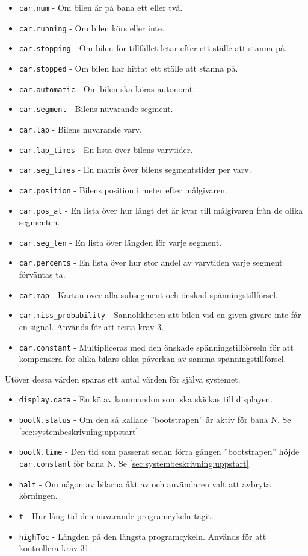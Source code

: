 \begin{itemize}

\item \texttt{car.num} - Om bilen är på bana ett eller två.
\item \texttt{car.running} - Om bilen körs eller inte.
\item \texttt{car.stopping} - Om bilen för tillfället letar efter ett ställe att stanna på.
\item \texttt{car.stopped} - Om bilen har hittat ett ställe att stanna på.
\item \texttt{car.automatic} - Om bilen ska köras autonomt.
\item \texttt{car.segment} - Bilens nuvarande segment.
\item \texttt{car.lap} - Bilens nuvarande varv.
\item \texttt{car.lap\_times} - En lista över bilens varvtider.
\item \texttt{car.seg\_times} - En matris över bilens segmentstider per varv.
\item \texttt{car.position} - Bilens position i meter efter målgivaren.
\item \texttt{car.pos\_at} - En lista över hur långt det är kvar till målgivaren från de olika segmenten.
\item \texttt{car.seg\_len} - En lista över längden för varje segment.
\item \texttt{car.percents} - En lista över hur stor andel av varvtiden varje segment förväntas ta.
\item \texttt{car.map} - Kartan över alla subsegment och önskad spänningstillförsel.
\item \texttt{car.miss\_probability} - Sannolikheten att bilen vid en given givare inte får en signal. Används för att testa krav 3.
\item \texttt{car.constant} - Multipliceras med den önskade spänningstillförseln för att
	kompensera för olika bilars olika påverkan av samma spänningstillförsel.

\end{itemize}


Utöver dessa värden sparas ett antal värden för själva systemet.

\begin{itemize}

	\item \texttt{display.data} - En kö av kommandon som ska skickas till displayen.
	\item \texttt{bootN.status} - Om den så kallade ''bootstrapen'' är aktiv för bana N. Se \ref{sec:systembeskrivning:uppstart}
	\item \texttt{bootN.time} - Den tid som passerat sedan förra gången ''bootstrapen'' höjde \texttt{car.constant} för bana N. Se 
	\ref{sec:systembeskrivning:uppstart}
	\item \texttt{halt} - Om någon av bilarna åkt av och användaren valt att avbryta körningen.
	\item \texttt{t} - Hur lång tid den nuvarande programcykeln tagit.
	\item \texttt{highToc} - Längden på den längsta programcykeln. Används för att kontrollera krav 31.

\end{itemize}

